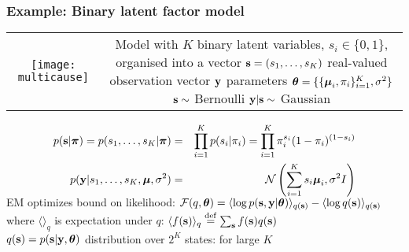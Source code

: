 \begin{frame}
\frametitle{Example: Binary latent factor model}
\begin{tabular}{cc}
\texttt{[image: multicause]} & \raisebox{0.45in}{\parbox{2.9in}{
Model with $K$ binary latent variables, $s_i\in\{0,1\}$, \\[1ex]
organised into a vector $\mathbf s=(s_1, \ldots, s_K)$ \\
real-valued observation vector $\mathbf y$ \\
parameters $\boldsymbol{\theta}=\{ \{ {\boldsymbol{\mu}}_i, \pi_i\}_{i=1}^K, \sigma^2\}$ \\[2ex]
$\mathbf s \sim$ Bernoulli \\ 
$\mathbf y | \mathbf s  \sim$ Gaussian  
}} 
\end{tabular}
\vspace*{-2.5ex}
\begin{eqnarray*}
p(\mathbf s|\boldsymbol{\pi}) = p(s_1, \ldots, s_K|\boldsymbol{\pi}) &=& \prod_{i=1}^K p(s_i|\pi_i) = \prod_{i=1}^K
\pi_i^{s_i} (1-\pi_i)^{(1-s_i)}  \\
p(\mathbf y|s_1, \ldots, s_K,{\boldsymbol{\mu}},\sigma^2) &=& {\cal N}\left(\sum_{i=1}^K s_i {\boldsymbol{\mu}}_i,
\sigma^2 I\right)  \\[-2ex]
\end{eqnarray*}
EM optimizes bound on likelihood: \hfill $ \displaystyle
{\cal F}(q,\boldsymbol{\theta}) = \langle \log p(\mathbf s, \mathbf y|\boldsymbol{\theta})\rangle_{q(\mathbf s)} -
\langle \log q(\mathbf s) \rangle_{q(\mathbf s)} 
$ \\
where $\langle \rangle_q$ is expectation under $q$:  \hspace{2em} $\langle
f(\mathbf s)\rangle_q \stackrel{\mathrm{def}}{=} \sum_{\mathbf s} f(\mathbf s) q(\mathbf s)$ \\[1.5ex]

 $q(\mathbf s) = p(\mathbf s|\mathbf y,\boldsymbol{\theta})$ distribution
over $2^K$ states:  for large $K$ 

\end{frame}
